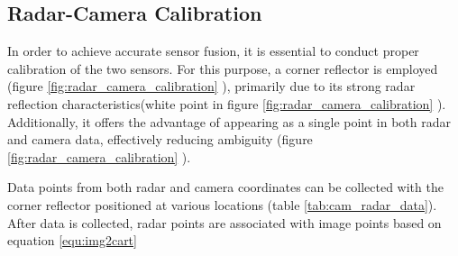 \subsection{Radar-Camera Calibration}
In order to achieve accurate sensor fusion, it is essential to conduct proper calibration of the two sensors. 
For this purpose, a corner reflector is employed (figure \ref*{fig:radar_camera_calibration} ), primarily due to its strong radar reflection characteristics(white point in figure \ref*{fig:radar_camera_calibration} ). 
Additionally, it offers the advantage of appearing as a single point in both radar and camera data, effectively reducing ambiguity (figure \ref*{fig:radar_camera_calibration} ).

Data points from both radar and camera coordinates can be collected with the corner reflector positioned at various locations
(table \ref{tab:cam_radar_data}).
After data is collected, radar points are associated with image points based on equation \ref*{equ:img2cart}
